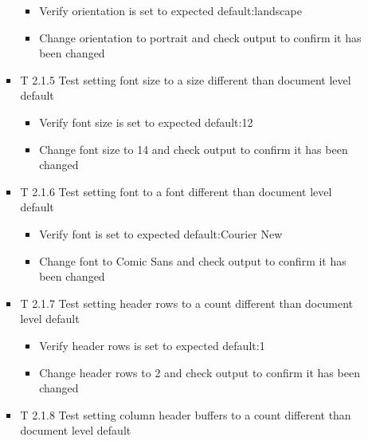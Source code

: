 \documentclass[]{article}
\providecommand{\tightlist}{%
  \setlength{\itemsep}{0pt}\setlength{\parskip}{0pt}}
\begin{document}
\begin{itemize}
\begin{itemize}
\begin{itemize}
      \begin{itemize}
      \tightlist
      \item
        Verify orientation is set to expected default:landscape
      \item
        Change orientation to portrait and check output to confirm it
        has been changed
      \end{itemize}
    \item
      T 2.1.5 Test setting font size to a size different than document
      level default

      \begin{itemize}
      \tightlist
      \item
        Verify font size is set to expected default:12
      \item
        Change font size to 14 and check output to confirm it has been
        changed\\
      \end{itemize}
    \item
      T 2.1.6 Test setting font to a font different than document level
      default

      \begin{itemize}
      \tightlist
      \item
        Verify font is set to expected default:Courier New
      \item
        Change font to Comic Sans and check output to confirm it has
        been changed
      \end{itemize}
    \item
      T 2.1.7 Test setting header rows to a count different than
      document level default

      \begin{itemize}
      \tightlist
      \item
        Verify header rows is set to expected default:1
      \item
        Change header rows to 2 and check output to confirm it has been
        changed\\
      \end{itemize}
    \item
      T 2.1.8 Test setting column header buffers to a count different
      than document level default


\end{itemize}
\end{itemize}
\end{itemize}
\end{document}
